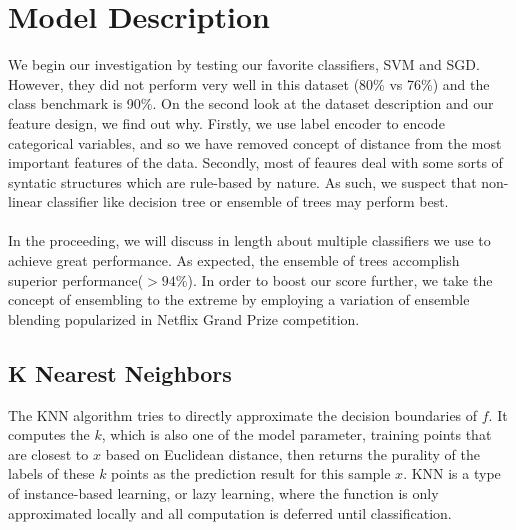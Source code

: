 \documentclass[conference]{IEEEtran}
\begin{document}
\newcommand{\vh}{\mathbf{h}}

\section{Model Description}
We begin our investigation by testing our favorite classifiers, SVM and SGD. However, they did not perform very well in this dataset (80\% vs 76\%) and the class benchmark is 90\%. On the second look at the dataset description and our feature design, we find out why. Firstly, we use label encoder to encode categorical variables, and so we have removed concept of distance from the most important features of the data. Secondly, most of feaures deal with some sorts of syntatic structures which are rule-based by nature. As such, we suspect that non-linear classifier like decision tree or ensemble of trees may perform best. \\ \\
In the proceeding, we will discuss in length about multiple classifiers we use to achieve great performance. As expected, the ensemble of trees accomplish superior performance($> 94$\%). In order to boost our score further, we take the concept of ensembling to the extreme by employing a variation of ensemble blending popularized in Netflix Grand Prize competition.

\subsection{K Nearest Neighbors}
The KNN algorithm tries to directly approximate the decision boundaries of $f$. It computes the $k$, which is also one of the model parameter, training points that are closest to $x$ based on Euclidean distance, then returns the purality of the labels of these $k$ points as the prediction result for this sample $x$. KNN is a type of instance-based learning, or lazy learning, where the function is only approximated locally and all computation is deferred until classification.
\end{document}
